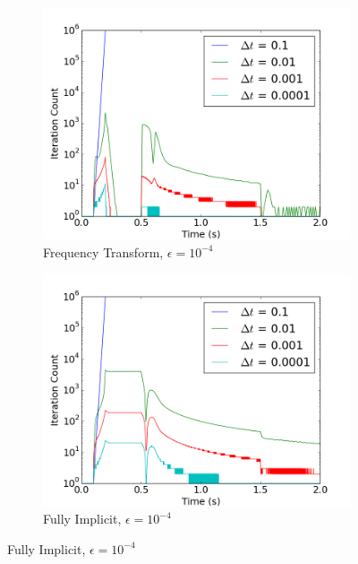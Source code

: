 \documentclass[12pt]{report}
\begin{document}
\begin{figure}[ht]
			\begin{subfigure}{.5\textwidth}
				\centering
				\includegraphics[width=.95\linewidth]{figs/iter_case2_conv2.png}
				\caption{Frequency Transform, $\epsilon = 10^{-4}$}
				\label{fig::iter_2_2_ft}
			\end{subfigure}%
			\begin{subfigure}{.5\textwidth}
				\centering
				\includegraphics[width=.95\linewidth]{figs/iter_case2_conv2_omega0.png}
				\caption{Fully Implicit, $\epsilon = 10^{-4}$}
				\label{fig::iter_2_2_fi}
			\end{subfigure}
			

\end{figure}
\end{document}
